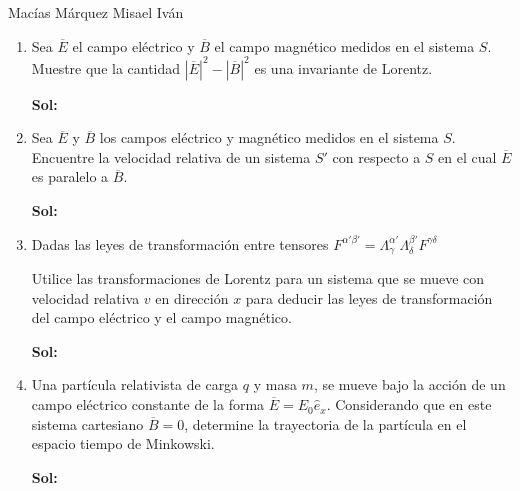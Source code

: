 \documentclass[12pt,a4paper]{article}
\begin{document}
Macías Márquez Misael Iván

\begin{enumerate}






\item Sea $\overline{E}$ el campo eléctrico y $\overline{B}$ el campo magnético medidos en el sistema $S$. Muestre que la cantidad $|\overline{E}|^2-|\overline{B}|^2$ es una invariante de Lorentz.

\textbf{Sol:} 






\item Sea $\overline{E}$ y $\overline{B}$ los campos eléctrico y magnético medidos en el sistema $S$. Encuentre la velocidad relativa de un sistema $S'$ con respecto a $S$ en el cual $\overline{E}$ es paralelo a $\overline{B}$.

\textbf{Sol:}







\item Dadas las leyes de transformación entre tensores $F^{\alpha' \beta'} = \Lambda_{\gamma}^{\alpha'}\Lambda_{\delta}^{\beta'}F^{\gamma \delta}$

Utilice las transformaciones de Lorentz para un sistema que se mueve con velocidad relativa $v$ en dirección $x$ para deducir las leyes de transformación del campo eléctrico y el campo magnético.

\textbf{Sol:}








\item Una partícula relativista de carga $q$ y masa $m$, se mueve bajo la acción de un campo eléctrico constante de la forma $\overline{E}=E_0 \hat{e}_x$. Considerando que en este sistema cartesiano $\overline{B}=0$, determine la trayectoria de la partícula en el espacio tiempo de Minkowski.

\textbf{Sol:}

    
    
\end{enumerate}
\end{document}
